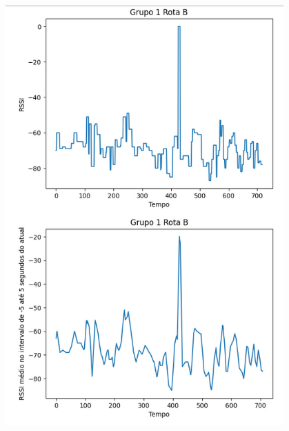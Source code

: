 \documentclass{article}
\begin{document}
\begin{figure}
  \begin{center}
    \includegraphics[width=0.95\textwidth]{figures/grupo_1-rota_b}
  \end{center}
  \caption{}\label{fig:}
\end{figure}
\end{document}
